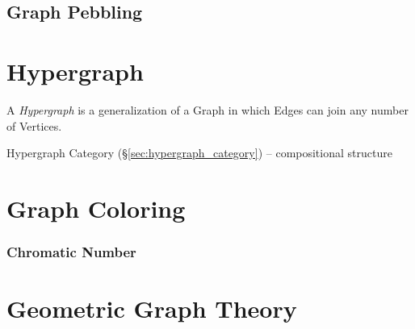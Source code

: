 \subsection{Graph Pebbling}\label{sec:graph_pebbling}




\section{Hypergraph}\label{sec:hypergraph}

A \emph{Hypergraph} is a generalization of a Graph in which Edges can join any
number of Vertices.

\fist Hypergraph Category (\S\ref{sec:hypergraph_category}) -- compositional
structure



\section{Graph Coloring}\label{sec:graph_coloring}

\subsubsection{Chromatic Number}\label{sec:chromatic_number}




\section{Geometric Graph Theory}\label{sec:geometric_graph_theory}

